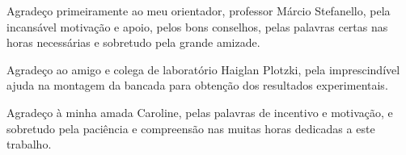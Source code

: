 Agradeço primeiramente ao meu orientador, professor Márcio Stefanello, pela incansável motivação e apoio, pelos bons conselhos, pelas palavras certas nas horas necessárias e sobretudo pela grande amizade.

Agradeço ao amigo e colega de laboratório Haiglan Plotzki, pela imprescindível ajuda na montagem da bancada para obtenção dos resultados experimentais.

Agradeço à minha amada Caroline, pelas palavras de incentivo e motivação, e sobretudo pela paciência e compreensão nas muitas horas dedicadas a este trabalho.


